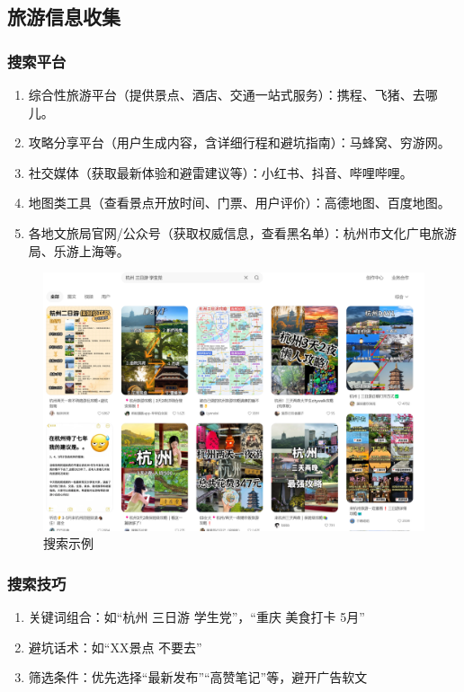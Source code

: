 \subsection{旅游信息收集}
\subsubsection{搜索平台}
\begin{enumerate}
  \item 综合性旅游平台（提供景点、酒店、交通一站式服务）：携程、飞猪、去哪儿。
  \item 攻略分享平台（用户生成内容，含详细行程和避坑指南）：马蜂窝、穷游网。
  \item 社交媒体（获取最新体验和避雷建议等）：小红书、抖音、哔哩哔哩。
  \item 地图类工具（查看景点开放时间、门票、用户评价）：高德地图、百度地图。
  \item 各地文旅局官网/公众号（获取权威信息，查看黑名单）：杭州市文化广电旅游局、乐游上海等。
\end{enumerate}
\begin{figure}[H]
\centering
\includegraphics[width=.8\textwidth]{./figures/生活/示例1.png}
\caption{搜索示例}
\end{figure}
\subsubsection{搜索技巧}
\begin{enumerate}
  \item 关键词组合：如“杭州 三日游 学生党”，“重庆 美食打卡 5月”
  \item 避坑话术：如“XX景点 不要去”
  \item 筛选条件：优先选择“最新发布”“高赞笔记”等，避开广告软文
\end{enumerate}
